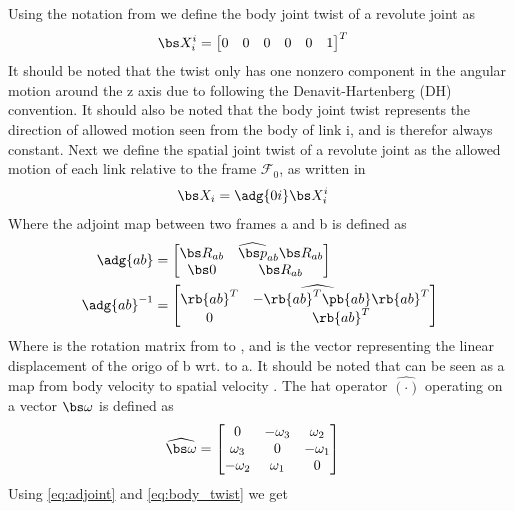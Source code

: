 Using the notation from \cite{kristin_jant} we define the body joint twist of a revolute joint as 
\begin{align}
	\bs X_i^i&=\begin{bmatrix} 0&0&0&0&0&1\end{bmatrix}^T
	\label{eq:body_twist}
\end{align}
It should be noted that the twist only has one nonzero component in the angular motion around the z axis due to following the Denavit-Hartenberg (DH) convention. It should also be noted that the body joint twist represents the direction of allowed motion seen from the body of link i, and is therefor always constant.
Next we define the spatial joint twist of a revolute joint as the allowed motion of each link relative to the frame $\mathcal{F}_0$, as written in \cite{kristin_jant}
\begin{align}
	\bs X_i&=\adg{0i}\bs X_i^i
	\label{eq:spatioal_twist}
\end{align}
Where the adjoint map between two frames \frame a and \frame b is defined as
\begin{align}
	\adg{ab}  &= \begin{bmatrix} \bs R_{ab} & \widehat{\bs p}_{ab}\bs R_{ab} \\ \bs 0 & \bs R_{ab} \end{bmatrix}
	\label{eq:adjoint}
  \\
	\adg{ab}^{-1} &= \begin{bmatrix} \rb{ab}^T & - \widehat{\rb{ab}^T\pb{ab}}\rb{ab}^T \\ 0 & \rb{ab}^T \end{bmatrix}
	\label{eq:adjoint2}
\end{align}
Where  is the rotation matrix from  to , and  is the vector representing the linear displacement of the origo of \frame b wrt. to \frame a. It should be noted that  can be seen as a map from body velocity  to spatial velocity .
The hat operator $\widehat{(\cdot)}$ operating on a vector $\bs \omega$ is defined as
 \begin{align}
   \widehat{\bs \omega}&= \begin{bmatrix} 0 & -\omega_3 & \omega_2 \\ \omega_3 & 0 & -\omega_1 \\ -\omega_2 & \omega_1 & 0 \end{bmatrix} 
   \label{eq:skewsym}
 \end{align}
Using  \eqref{eq:adjoint} and \eqref{eq:body_twist} we get

